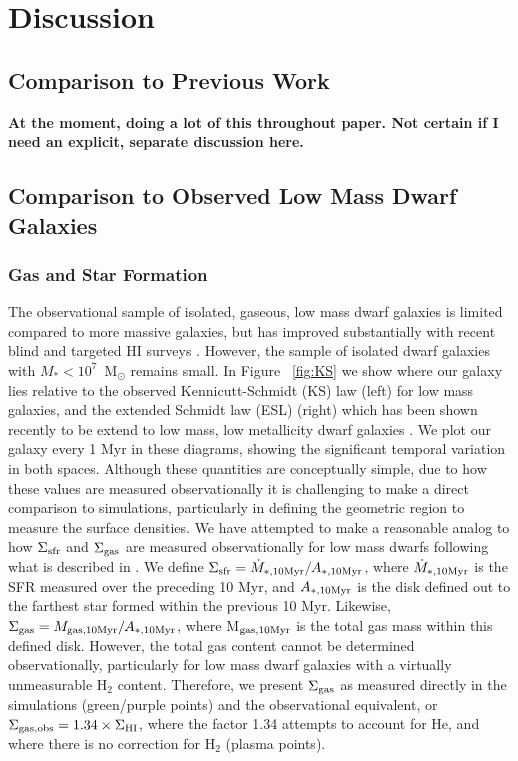 \documentclass[twocolumn]{aastex61}
\begin{document}
\section{Discussion}
\label{sec:discussion}

\subsection{Comparison to Previous Work}
\textbf{At the moment, doing a lot of this throughout paper. Not certain if I need an explicit, separate discussion here.}

\subsection{Comparison to Observed Low Mass Dwarf Galaxies}
\label{sec:observation}

\subsubsection{Gas and Star Formation}
\label{sec:gas_sf}

The observational sample of isolated, gaseous, low mass dwarf galaxies is limited compared to more massive galaxies, but has improved substantially with recent blind and targeted HI surveys \citep[e.g.][]{Giovanelli2005, Geha2006, Geha2012, Walter2008, Cannon2011, Haynes2011, Hunter2012, Bradford2015, Tollerud2015, Sand2015}. However, the sample of isolated dwarf galaxies with $M_{*} < 10^{7}$~M$_{\odot}$ remains small. In Figure ~\ref{fig:KS} we show where our galaxy lies relative to the observed Kennicutt-Schmidt (KS) law (left) for low mass galaxies, and the extended Schmidt law (ESL) (right) which has been shown recently to be extend to low mass, low metallicity dwarf galaxies \citep{Roychowdhury2017}. We plot our galaxy every 1 Myr in these diagrams, showing the significant temporal variation in both spaces. Although these quantities are conceptually simple, due to how these values are measured observationally it is challenging to make a direct comparison to simulations, particularly in defining the geometric region to measure the surface densities. We have attempted to make a reasonable analog to how $\Sigma_{\rm sfr}$ and $\Sigma_{\rm gas}$ are measured observationally for low mass dwarfs following what is described in \citet{Roychowdhury2014}. We define $\Sigma_{\rm sfr} = \dot{M}_{*, \rm{10 Myr}} / A_{*, \rm{10 Myr}}$, where $\dot{M}_{*, \rm{10 Myr}}$ is the SFR measured over the preceding 10 Myr, and $A_{*, \rm{10 Myr}}$ is the disk defined out to the farthest star formed within the previous 10 Myr. Likewise, $\Sigma_{\rm gas} = M_{\rm gas, 10 Myr} / A_{*, \rm{10 Myr}}$, where M$_{\rm gas, 10 Myr}$ is the total gas mass within this defined disk. However, the total gas content cannot be determined observationally, particularly for low mass dwarf galaxies with a virtually unmeasurable H$_2$ content. Therefore, we present $\Sigma_{\rm gas}$ as measured directly in the simulations (green/purple points) and the observational equivalent, or $\Sigma_{\rm gas, obs} = 1.34 \times \Sigma_{\rm HI}$, where the factor 1.34 attempts to account for He, and where there is no correction for H$_2$ (plasma points). 
\end{document}
